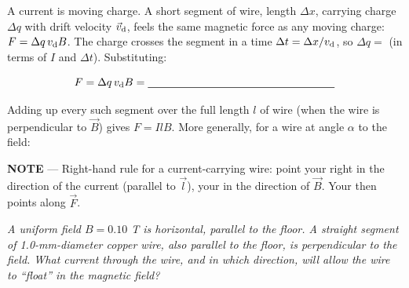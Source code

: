\documentclass[12pt]{article}
\begin{document}



A current is moving charge. A short segment of wire, length $\Delta x$,
carrying charge $\Delta q$ with drift velocity $\vec v_{\text d}$, feels
the same magnetic force as any moving charge: $F=\Delta q\,v_{\text
d}B$. The charge crosses the segment in a time $\Delta t=\Delta
x/v_{\text d}$, so $\Delta q = $ \bl[3cm]  (in terms of $I$ and
$\Delta t$). Substituting:

\[
F = \Delta q\, v_{\text d} B = \bl[6cm]
\]

Adding up every such segment over the full length $l$ of wire (when
the wire is perpendicular to $\vec B$) gives $F=IlB$. More generally,
for a wire at angle $\alpha$ to the field:



\textbf{NOTE} --- Right-hand rule for a current-carrying wire: point
your right \bl[2.5cm] in the direction of the current (parallel to
$\vec l$), your \bl[2.5cm] in the direction of $\vec B$. Your
\bl[2.5cm] then points along $\vec F$.


\textit{A uniform field $B=0.10$ T is horizontal, parallel to the
floor. A straight segment of 1.0-mm-diameter copper wire, also
parallel to the floor, is perpendicular to the field. What current
through the wire, and in which direction, will allow the wire to
``float'' in the magnetic field?}
\end{document}
